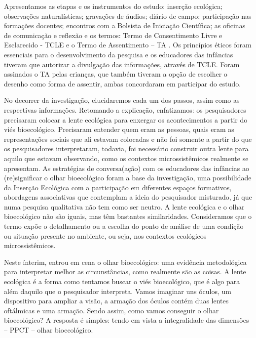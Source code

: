 \documentclass{textolivre}
\begin{document}
Apresentamos as etapas e os instrumentos do estudo: inserção ecológica; observações naturalísticas; gravações de áudios; diário de campo; participação nas formações docentes; encontros com a Bolsista de Iniciação Científica; as oficinas de comunicação e reflexão e os termos: Termo de Consentimento Livre e Esclarecido - TCLE e o Termo de Assentimento -- TA \cite{Missio2018}. Os princípios éticos foram essenciais para o desenvolvimento da pesquisa e os educadores das infâncias tiveram que autorizar a divulgação das informações, através de TCLE. Foram assinados o TA pelas crianças, que também tiveram a opção de escolher o desenho como forma de assentir, ambas concordaram em participar do estudo.

No decorrer da investigação, elucidaremos cada um dos passos, assim como as respectivas informações. Retomando a explicação, enfatizamos: os pesquisadores precisaram colocar a lente ecológica para enxergar os acontecimentos a partir do viés bioecológico. Precisaram entender quem eram as pessoas, quais eram as representações sociais que ali estavam colocadas e não foi somente a partir do que os pesquisadores interpretaram, todavia, foi necessário construir outra lente para aquilo que estavam observando, como os contextos microssistêmicos realmente se apresentam. 
As estratégias de conversa(ação) com os educadores das infâncias ao (re)significar o olhar bioecológico foram a base da investigação, uma possibilidade da Inserção Ecológica \cite{piske2018c,koller2016,silveira2009} com a participação em diferentes espaços formativos, abordagens associativas que contemplam a ideia do pesquisador misturado, já que numa pesquisa qualitativa não tem como ser neutro. A lente ecológica e o olhar bioecológico não são iguais, mas têm bastantes similaridades. Consideramos que o termo expõe o detalhamento ou a escolha do ponto de análise de uma condição ou situação presente no ambiente, ou seja, nos contextos ecológicos microssistêmicos. 

Neste ínterim, entrou em cena o olhar bioecológico: uma evidência metodológica para interpretar melhor as circunstâncias, como realmente são as coisas. A lente ecológica é a forma como tentamos buscar o viés bioecológico, que é algo para além daquilo que o pesquisador interpreta. Vamos imaginar uns óculos, um dispositivo para ampliar a visão, a armação dos óculos contém duas lentes oftálmicas e uma armação. Sendo assim, como vamos conseguir o olhar bioecológico? A resposta é simples: tendo em vista a integralidade das dimensões -- PPCT -- olhar bioecológico. 
\end{document}
